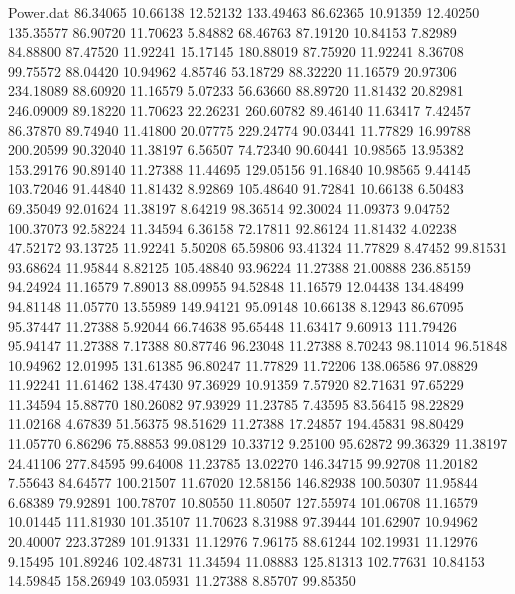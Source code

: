\begin{filecontents}{Power.dat}
  86.34065   10.66138   12.52132  133.49463
  86.62365   10.91359   12.40250  135.35577
  86.90720   11.70623    5.84882   68.46763
  87.19120   10.84153    7.82989   84.88800
  87.47520   11.92241   15.17145  180.88019
  87.75920   11.92241    8.36708   99.75572
  88.04420   10.94962    4.85746   53.18729
  88.32220   11.16579   20.97306  234.18089
  88.60920   11.16579    5.07233   56.63660
  88.89720   11.81432   20.82981  246.09009
  89.18220   11.70623   22.26231  260.60782
  89.46140   11.63417    7.42457   86.37870
  89.74940   11.41800   20.07775  229.24774
  90.03441   11.77829   16.99788  200.20599
  90.32040   11.38197    6.56507   74.72340
  90.60441   10.98565   13.95382  153.29176
  90.89140   11.27388   11.44695  129.05156
  91.16840   10.98565    9.44145  103.72046
  91.44840   11.81432    8.92869  105.48640
  91.72841   10.66138    6.50483   69.35049
  92.01624   11.38197    8.64219   98.36514
  92.30024   11.09373    9.04752  100.37073
  92.58224   11.34594    6.36158   72.17811
  92.86124   11.81432    4.02238   47.52172
  93.13725   11.92241    5.50208   65.59806
  93.41324   11.77829    8.47452   99.81531
  93.68624   11.95844    8.82125  105.48840
  93.96224   11.27388   21.00888  236.85159
  94.24924   11.16579    7.89013   88.09955
  94.52848   11.16579   12.04438  134.48499
  94.81148   11.05770   13.55989  149.94121
  95.09148   10.66138    8.12943   86.67095
  95.37447   11.27388    5.92044   66.74638
  95.65448   11.63417    9.60913  111.79426
  95.94147   11.27388    7.17388   80.87746
  96.23048   11.27388    8.70243   98.11014
  96.51848   10.94962   12.01995  131.61385
  96.80247   11.77829   11.72206  138.06586
  97.08829   11.92241   11.61462  138.47430
  97.36929   10.91359    7.57920   82.71631
  97.65229   11.34594   15.88770  180.26082
  97.93929   11.23785    7.43595   83.56415
  98.22829   11.02168    4.67839   51.56375
  98.51629   11.27388   17.24857  194.45831
  98.80429   11.05770    6.86296   75.88853
  99.08129   10.33712    9.25100   95.62872
  99.36329   11.38197   24.41106  277.84595
  99.64008   11.23785   13.02270  146.34715
  99.92708   11.20182    7.55643   84.64577
 100.21507   11.67020   12.58156  146.82938
 100.50307   11.95844    6.68389   79.92891
 100.78707   10.80550   11.80507  127.55974
 101.06708   11.16579   10.01445  111.81930
 101.35107   11.70623    8.31988   97.39444
 101.62907   10.94962   20.40007  223.37289
 101.91331   11.12976    7.96175   88.61244
 102.19931   11.12976    9.15495  101.89246
 102.48731   11.34594   11.08883  125.81313
 102.77631   10.84153   14.59845  158.26949
 103.05931   11.27388    8.85707   99.85350

\end{filecontents}
